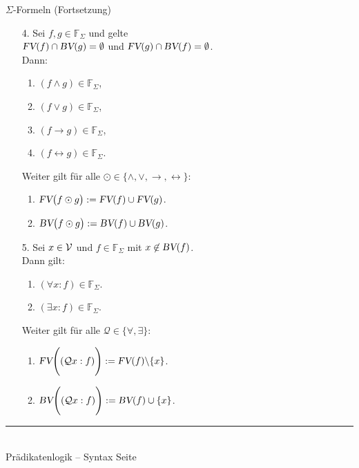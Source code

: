 \documentclass{slides}
\newcommand{\myrule}{\rule{20cm}{1mm}\\ }
\newcommand{\FV}{\textsl{FV}}
\newcommand{\BV}{\textsl{BV}}
\newcounter{mypage}
\begin{document}
\begin{slide}{}
\normalsize
\begin{center}
$\Sigma$-Formeln (Fortsetzung)
\end{center}
\vspace{0.5cm}

\footnotesize
\begin{enumerate}
\item[4.] Sei $f, g \in \mathbb{F}_\Sigma$ und gelte \\[0.3cm]
      \hspace*{1.3cm} $\FV(f) \cap \BV(g) = \emptyset$ \quad und \quad
                      $\FV(g) \cap \BV(f) = \emptyset$. \\[0.3cm]
      Dann:
      \begin{enumerate}
      \item $(f \wedge g) \in \mathbb{F}_\Sigma$,
      \item $(f \vee g) \in \mathbb{F}_\Sigma$,
      \item $(f \rightarrow g) \in \mathbb{F}_\Sigma$,
      \item $(f \leftrightarrow g) \in \mathbb{F}_\Sigma$.
      \end{enumerate}
      Weiter gilt für alle $\odot \in \{ \wedge, \vee, \rightarrow, \leftrightarrow \}$:
      \begin{enumerate}
      \item $\FV\bigl( f \odot g \bigr) := \FV(f) \cup \FV(g)$.
      \item $\BV\bigl( f \odot g \bigr) := \BV(f) \cup \BV(g)$.
      \end{enumerate}
\item[5.] Sei  $x \in {\cal V}$  und $f \in \mathbb{F}_\Sigma$ mit $x \not\in \BV(f)$. \\[0.3cm]
      Dann gilt:
      \begin{enumerate}
      \item $(\forall x : f) \in \mathbb{F}_\Sigma$.
      \item $(\exists x : f) \in \mathbb{F}_\Sigma$.
      \end{enumerate}
      Weiter gilt für alle $\mathcal{Q} \in \{ \forall, \exists \}$:
      \begin{enumerate}
      \item $\FV\Bigg( (\mathcal{Q} x : f) \Bigg) := \FV(f) \backslash \{x\}$.
      \item $\BV\Bigg( (\mathcal{Q} x : f) \Bigg) := \BV(f) \cup \{x\}$.  
      \end{enumerate}
\end{enumerate}


\vspace*{\fill}
\tiny \addtocounter{mypage}{1}
\myrule
Prädikatenlogik -- Syntax  \hspace*{\fill} Seite 
\end{slide}
\end{document}
